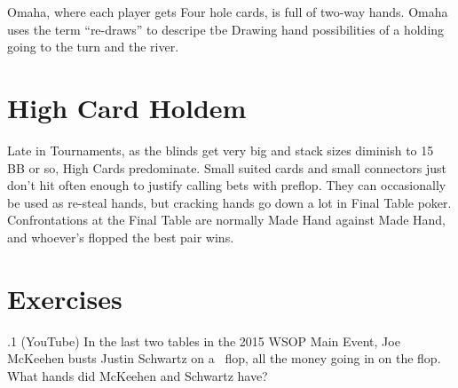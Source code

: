 Omaha, where each player gets Four hole cards, is full of two-way
hands. Omaha uses the term ``re-draws'' to descripe tbe Drawing hand
possibilities of a holding going to the turn and the river.

\section{High Card Holdem}

Late in Tournaments, as the blinds get very big and stack sizes diminish
to 15 BB or so, High Cards predominate. Small suited cards and small
connectors just don't hit often enough to justify calling bets with
preflop. They can occasionally be used as re-steal hands, but cracking
hands go down a lot in Final Table poker. Confrontations at the Final
Table are normally Made Hand against Made Hand, and whoever's flopped
the best pair wins.

\section{Exercises}


.1 (YouTube) In the last two tables in the 2015 WSOP
Main Event, Joe McKeehen busts Justin Schwartz on a
\sixh\tred\twod\ flop, all the money going in on the flop. What hands
did McKeehen and Schwartz have?
